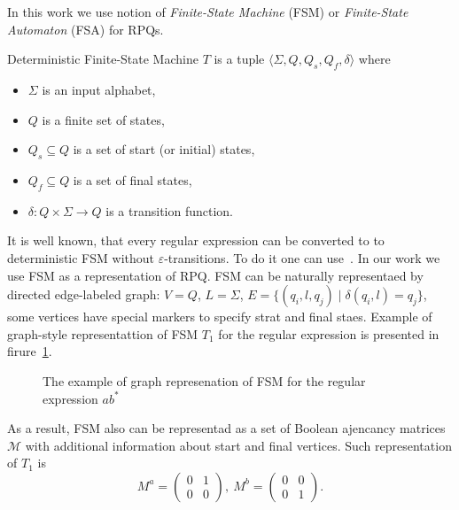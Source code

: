 In this work we use notion of \textit{Finite-State Machine} (FSM) or \textit{Finite-State Automaton} (FSA) for RPQs. 

\begin{definition}
Deterministic Finite-State Machine $T$ is a tuple $\langle \Sigma, Q, Q_s, Q_f, \delta \rangle$ where
\begin{itemize}
	\item $\Sigma$ is an input alphabet,
	\item $Q$ is a finite set of states,
	\item $Q_s \subseteq Q$ is a set of start (or initial) states,
	\item $Q_f \subseteq Q$ is a set of final states,
    \item $\delta: Q \times \Sigma \to Q$ is a transition function.
\end{itemize}
\end{definition}

It is well known, that every regular expression can be converted to to deterministic FSM without $\varepsilon$-transitions.
To do it one can use~\cite{}.
In our work we use FSM as a representation of RPQ. 
FSM can be naturally representaed by directed edge-labeled graph: $V = Q$, $L = \Sigma$, $E = \{(q_i,l,q_j) \mid \delta(q_i,l) = q_j\}$, some vertices have special markers to specify strat and final staes. Example of graph-style representattion of FSM $T_1$ for the regular expression is presented in firure~\ref{fig:example_fsm}.

\begin{figure}[h]
    \centering        
    \caption{The example of graph represenation of FSM for the regular expression $ab^*$}
    \label{fig:example_fsm}
\end{figure}

As a result, FSM also can be representad as a set of Boolean ajencancy matrices $\mathcal{M}$ with additional information about start and final vertices. Such representation of $T_1$ is
$$
M^a =
\begin{pmatrix}
0&1 \\
0&0
\end{pmatrix},~
M^b =
\begin{pmatrix}
0&0 \\
0&1
\end{pmatrix}.
$$  


